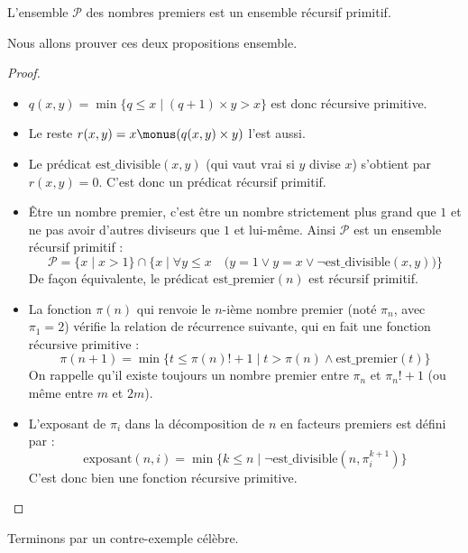 \documentclass[11pt,class=report,crop=false]{standalone}
\begin{document}
\begin{proposition}
L'ensemble $\mathcal{P}$ des nombres premiers est un ensemble récursif primitif.
\end{proposition}

Nous allons prouver ces deux propositions ensemble.

\begin{proof}
    ~
\begin{itemize}
    \item $q(x,y) = \min \{ q \le x \mid (q+1) \times y > x \}$ est donc récursive primitive.
    
    \item Le reste $r(x,y) = x \monus (q(x,y) \times y)$ l'est aussi.

    \item Le prédicat $\text{est\_divisible}(x,y)$ (qui vaut vrai si $y$ divise $x$) s'obtient par $r(x,y) = 0$. C'est donc un prédicat récursif primitif.
    
    \item Être un nombre premier, c'est être un nombre strictement plus grand que $1$ et ne pas avoir d'autres diviseurs que $1$ et lui-même.
    Ainsi $\mathcal{P}$ est un ensemble récursif primitif :
    \[
    \mathcal{P} = \big\{ x \mid x > 1\big\}
    \cap 
    \big\{ x \mid \forall y \le x \quad \big( y=1 \lor y=x \lor \lnot \text{est\_divisible}(x,y) \big) \big\}
    \]
    De façon équivalente, le prédicat $\text{est\_premier}(n)$ est récursif primitif.

    \item La fonction $\pi(n)$ qui renvoie le $n$-ième nombre premier (noté $\pi_n$, avec $\pi_1=2$) vérifie la relation de récurrence suivante, qui en fait une fonction récursive primitive :
    \[
    \pi(n+1) = \min \big\{ t \le \pi(n)! + 1 \mid t > \pi(n) \land \text{est\_premier}(t) \big\}
    \]
    On rappelle qu'il existe toujours un nombre premier entre $\pi_n$ et $\pi_n ! + 1$  (ou même entre $m$ et $2m$).
    
    \item L'exposant de $\pi_i$ dans la décomposition de $n$ en facteurs premiers est défini par :
    \[
    \text{exposant}(n,i) = \min \big\{ k \le n \mid \lnot \text{est\_divisible}(n, \pi_i^{k+1}) \big\} 
    \]
    C'est donc bien une fonction récursive primitive.
\end{itemize}
\end{proof}

\bigskip

Terminons par un contre-exemple célèbre.
\end{document}
